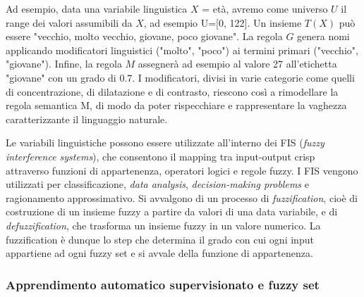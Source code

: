 \documentclass[11pt]{article}
\begin{document}
Ad esempio, data una variabile linguistica $X$ = età, avremo come universo $U$ il range dei valori assumibili da $X$, ad esempio U=[0, 122]. Un insieme $T(X)$ può essere "vecchio, molto vecchio, giovane, poco giovane". La regola $G$ genera nomi applicando modificatori linguistici ("molto", "poco") ai termini primari ("vecchio", "giovane"). Infine, la regola $M$ assegnerà ad esempio al valore 27 all'etichetta "giovane" con un grado di 0.7. I modificatori, divisi in varie categorie come quelli di concentrazione, di dilatazione e di contrasto, riescono così a rimodellare la regola semantica M, di modo da poter rispecchiare e rappresentare la vaghezza caratterizzante il linguaggio naturale. 

Le variabili linguistiche possono essere utilizzate all'interno dei FIS (\textit{fuzzy interference systems})\cite{fis}, che consentono il mapping tra input-output crisp attraverso funzioni di appartenenza, operatori logici e regole fuzzy. I FIS vengono utilizzati per classificazione, \textit{data analysis}, \textit {decision-making problems} e ragionamento approssimativo. Si avvalgono di un processo di \textit{fuzzification}\cite{fuzzific}, cioè di costruzione di un insieme fuzzy a partire da valori di una data variabile, e di \textit{defuzzification}, che trasforma un insieme fuzzy in un valore numerico. La fuzzification è dunque lo step che determina il grado con cui ogni input appartiene ad ogni fuzzy set e si avvale della funzione di appartenenza. 

\subsubsection{Apprendimento automatico supervisionato e fuzzy set}
\end{document}

